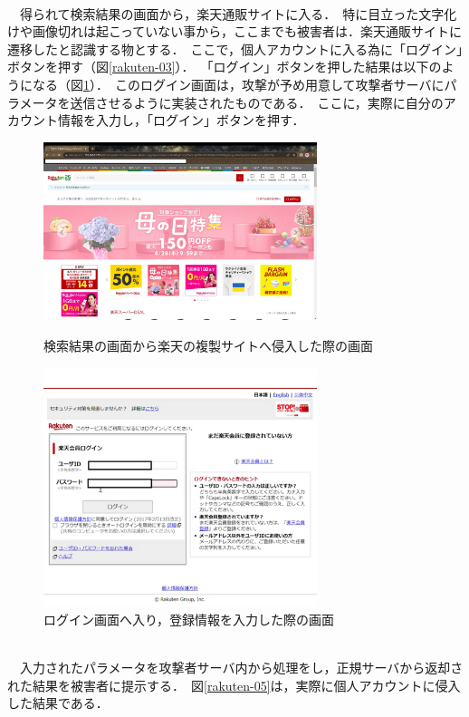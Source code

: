 \documentclass[dvipdfmx,twocolumn]{jsarticle}
\begin{document}
                \\
                　得られて検索結果の画面から，楽天通販サイトに入る．\
                特に目立った文字化けや画像切れは起こっていない事から，ここまでも被害者は．楽天通販サイトに遷移したと認識する物とする．\
                ここで，個人アカウントに入る為に「ログイン」ボタンを押す（図\ref{rakuten-03}）．\
                「ログイン」ボタンを押した結果は以下のようになる（図\ref{rakuten-04}）．\
                このログイン画面は，攻撃が予め用意して攻撃者サーバにパラメータを送信させるように実装されたものである．\
                ここに，実際に自分のアカウント情報を入力し，「ログイン」ボタンを押す．\
                \begin{figure}[h]
                    \centering
                    \includegraphics[width=8cm]{img/rakuten/rakuten-03.png}
                    \caption{検索結果の画面から楽天の複製サイトへ侵入した際の画面}
                    \label{rakuten-03}
                    \includegraphics[width=8cm]{img/rakuten/rakuten-04.png}
                    \caption{ログイン画面へ入り，登録情報を入力した際の画面}
                    \label{rakuten-04}
                \end{figure}
                \\
                　入力されたパラメータを攻撃者サーバ内から処理をし，正規サーバから返却された結果を被害者に提示する．\
                図\ref{rakuten-05}は，実際に個人アカウントに侵入した結果である．\
\end{document}
